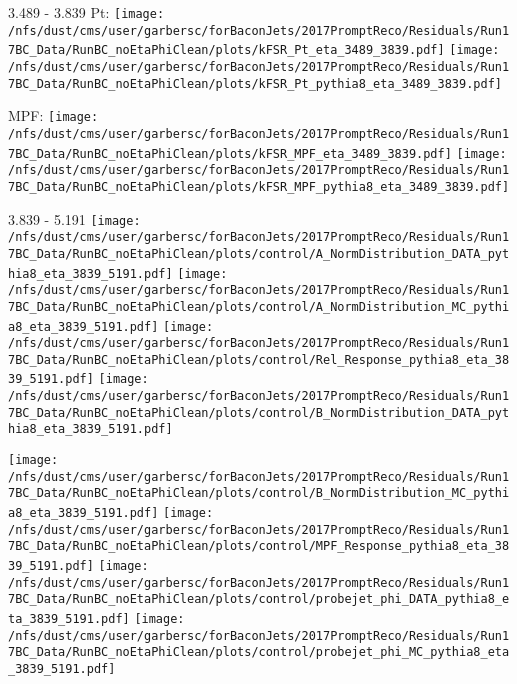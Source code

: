 \documentclass[t,compress]{beamer}
\begin{document}
\begin{frame}{3.489 - 3.839}
	 Pt: \texttt{[image: /nfs/dust/cms/user/garbersc/forBaconJets/2017PromptReco/Residuals/Run17BC\_Data/RunBC\_noEtaPhiClean/plots/kFSR\_Pt\_eta\_3489\_3839.pdf]}
	\texttt{[image: /nfs/dust/cms/user/garbersc/forBaconJets/2017PromptReco/Residuals/Run17BC\_Data/RunBC\_noEtaPhiClean/plots/kFSR\_Pt\_pythia8\_eta\_3489\_3839.pdf]}
\newline

	 MPF: \texttt{[image: /nfs/dust/cms/user/garbersc/forBaconJets/2017PromptReco/Residuals/Run17BC\_Data/RunBC\_noEtaPhiClean/plots/kFSR\_MPF\_eta\_3489\_3839.pdf]}
	\texttt{[image: /nfs/dust/cms/user/garbersc/forBaconJets/2017PromptReco/Residuals/Run17BC\_Data/RunBC\_noEtaPhiClean/plots/kFSR\_MPF\_pythia8\_eta\_3489\_3839.pdf]}
\end{frame}

\begin{frame}{3.839 - 5.191}
	\texttt{[image: /nfs/dust/cms/user/garbersc/forBaconJets/2017PromptReco/Residuals/Run17BC\_Data/RunBC\_noEtaPhiClean/plots/control/A\_NormDistribution\_DATA\_pythia8\_eta\_3839\_5191.pdf]}
	\texttt{[image: /nfs/dust/cms/user/garbersc/forBaconJets/2017PromptReco/Residuals/Run17BC\_Data/RunBC\_noEtaPhiClean/plots/control/A\_NormDistribution\_MC\_pythia8\_eta\_3839\_5191.pdf]}
	\texttt{[image: /nfs/dust/cms/user/garbersc/forBaconJets/2017PromptReco/Residuals/Run17BC\_Data/RunBC\_noEtaPhiClean/plots/control/Rel\_Response\_pythia8\_eta\_3839\_5191.pdf]}
	\texttt{[image: /nfs/dust/cms/user/garbersc/forBaconJets/2017PromptReco/Residuals/Run17BC\_Data/RunBC\_noEtaPhiClean/plots/control/B\_NormDistribution\_DATA\_pythia8\_eta\_3839\_5191.pdf]}
\newline

	\texttt{[image: /nfs/dust/cms/user/garbersc/forBaconJets/2017PromptReco/Residuals/Run17BC\_Data/RunBC\_noEtaPhiClean/plots/control/B\_NormDistribution\_MC\_pythia8\_eta\_3839\_5191.pdf]}
	\texttt{[image: /nfs/dust/cms/user/garbersc/forBaconJets/2017PromptReco/Residuals/Run17BC\_Data/RunBC\_noEtaPhiClean/plots/control/MPF\_Response\_pythia8\_eta\_3839\_5191.pdf]}
	\texttt{[image: /nfs/dust/cms/user/garbersc/forBaconJets/2017PromptReco/Residuals/Run17BC\_Data/RunBC\_noEtaPhiClean/plots/control/probejet\_phi\_DATA\_pythia8\_eta\_3839\_5191.pdf]}
	\texttt{[image: /nfs/dust/cms/user/garbersc/forBaconJets/2017PromptReco/Residuals/Run17BC\_Data/RunBC\_noEtaPhiClean/plots/control/probejet\_phi\_MC\_pythia8\_eta\_3839\_5191.pdf]}
\end{frame}
\end{document}
